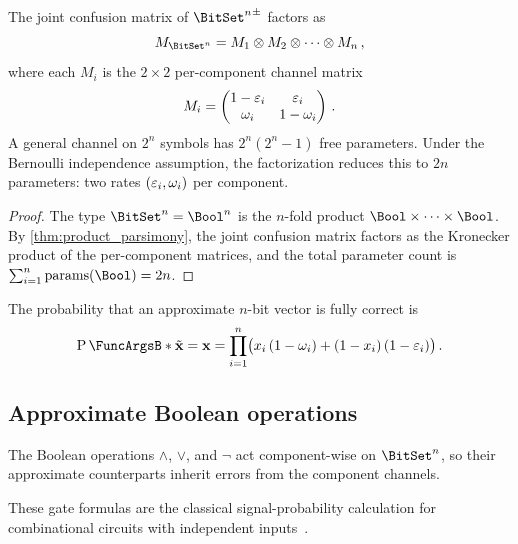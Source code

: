 \documentclass[ ../main.tex]{subfiles}
\begin{document}
\begin{theorem}
\label{thm:bitvec_kronecker}
The joint confusion matrix of $\AT{\BitSet^n}$ factors as
\begin{equation}
\label{eq:bitvec_kronecker}
	M_{\BitSet^n}
	= M_1 \otimes M_2 \otimes \cdots \otimes M_n\,,
\end{equation}
where each $M_i$ is the $2 \times 2$ per-component channel matrix
\begin{equation}
	M_i
	= \begin{pmatrix}
		1 - \varepsilon_i & \varepsilon_i \\
		\omega_i     & 1 - \omega_i
	  \end{pmatrix}\,.
\end{equation}
A general channel on $2^n$ symbols has $2^n(2^n - 1)$ free parameters.
Under the Bernoulli independence assumption, the factorization reduces this to $2n$ parameters:
two rates $(\varepsilon_i, \omega_i)$ per component.
\end{theorem}
\begin{proof}
The type $\BitSet^n = \Bool^n$ is the $n$-fold product $\Bool \times \cdots \times \Bool$.
By \cref{thm:product_parsimony}, the joint confusion matrix factors as the
Kronecker product of the per-component matrices, and the total parameter count
is $\sum_{i=1}^{n} \mathrm{params}(\Bool) = 2n$.
\end{proof}

\begin{corollary}
\label{cor:bitvec_correct}
The probability that an approximate $n$-bit vector is fully correct is
\begin{equation}
	\Prob{\tilde{\mathbf{x}} = \mathbf{x}}
	= \prod_{i=1}^{n}
	  \bigl(x_i\,(1 - \fnrate_i) + (1 - x_i)\,(1 - \fprate_i)\bigr)\,.
\end{equation}
\end{corollary}

\subsection{Approximate Boolean operations}

The Boolean operations $\wedge$, $\vee$, and $\neg$ act component-wise
on $\BitSet^n$, so their approximate counterparts inherit errors from the
component channels.

These gate formulas are the classical signal-probability calculation for
combinational circuits with independent inputs~\cite{parker1975probabilistic,krishnaswamy2008ptm}.
\end{document}
